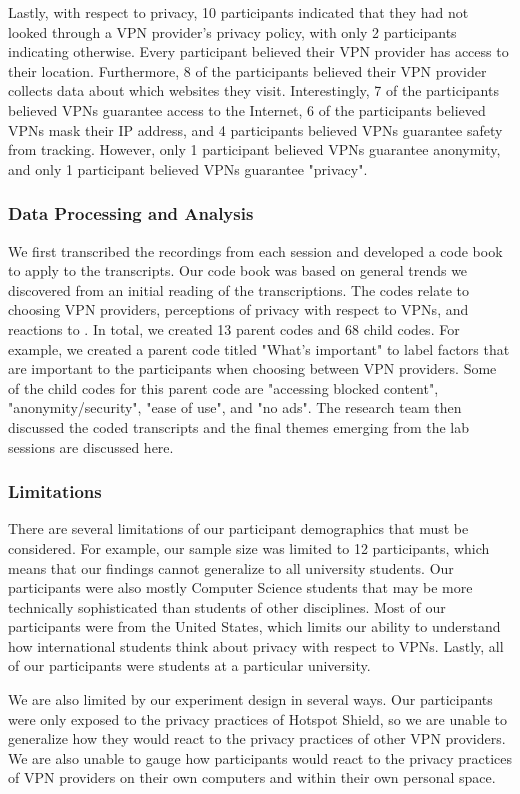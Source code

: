 Lastly, with respect to privacy, 10 participants indicated that they had not looked through a VPN provider's privacy policy, with only 2 participants indicating otherwise.
Every participant believed their VPN provider has access to their location.
Furthermore, 8 of the participants believed their VPN provider collects data about which websites they visit.
Interestingly, 7 of the participants believed VPNs guarantee access to the Internet, 6 of the participants believed VPNs mask their IP address, and 4 participants believed VPNs guarantee safety from tracking.
However, only 1 participant believed VPNs guarantee anonymity, and only 1 participant believed VPNs guarantee "privacy".

\subsubsection{Data Processing and Analysis}
We first transcribed the recordings from each session and developed a code book to apply to the transcripts.
Our code book was based on general trends we discovered from an initial reading of the transcriptions.
The codes relate to choosing VPN providers, perceptions of privacy with respect to VPNs, and reactions to \tool.
In total, we created 13 parent codes and 68 child codes. For example, we created a parent code titled "What's important" to label factors that are important to the participants when choosing between VPN providers. Some of the child codes for this parent code are "accessing blocked content", "anonymity/security", "ease of use", and "no ads". The research team then discussed the coded transcripts and the final themes emerging from the lab sessions are discussed here.

\subsubsection{Limitations}
There are several limitations of our participant demographics that must be considered.
For example, our sample size was limited to 12 participants, which means that our findings cannot generalize to all university students.
Our participants were also mostly Computer Science students that may be more technically sophisticated than students of other disciplines.
Most of our participants were from the United States, which limits our ability to understand how international students think about privacy with respect to VPNs.
Lastly, all of our participants were students at a particular university.

We are also limited by our experiment design in several ways.
Our participants were only exposed to the privacy practices of Hotspot Shield, so we are unable to generalize how they would react to the privacy practices of other VPN providers.
We are also unable to gauge how participants would react to the privacy practices of VPN providers on their own computers and within their own personal space.
